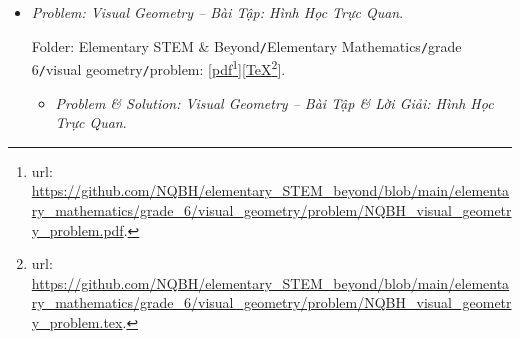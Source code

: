 \documentclass[12pt]{article}
\begin{document}
\begin{itemize}
	Folder: {\sf Elementary STEM \& Beyond{\tt/}Elementary Mathematics{\tt/}grade 6{\tt/}integer{\tt/}problem}: [\href{https://github.com/NQBH/elementary_STEM_beyond/blob/main/elementary_mathematics/grade_6/integer/problem/NQBH_integer_problem.pdf}{pdf}\footnote{{\sc url}: \url{https://github.com/NQBH/elementary_STEM_beyond/blob/main/elementary_mathematics/grade_6/integer/problem/NQBH_integer_problem.pdf}.}][\href{https://github.com/NQBH/elementary_STEM_beyond/blob/main/elementary_mathematics/grade_6/integer/problem/NQBH_integer_problem.tex}{\TeX}\footnote{{\sc url}: \url{https://github.com/NQBH/elementary_STEM_beyond/blob/main/elementary_mathematics/grade_6/integer/problem/NQBH_integer_problem.tex}.}].
	\begin{itemize}
		\item {\it Problem \& Solution: Integers $\mathbb{Z}$ -- Bài Tập \& Lời Giải: Số Nguyên $\mathbb{Z}$}.
		
		Folder: {\sf Elementary STEM \& Beyond{\tt/}Elementary Mathematics{\tt/}grade 6{\tt/}integer{\tt/}solution}: [\href{https://github.com/NQBH/elementary_STEM_beyond/blob/main/elementary_mathematics/grade_6/integer/problem/NQBH_integer_solution.pdf}{pdf}\footnote{{\sc url}: \url{https://github.com/NQBH/elementary_STEM_beyond/blob/main/elementary_mathematics/grade_6/integer/problem/NQBH_integer_solution.pdf}.}][\href{https://github.com/NQBH/elementary_STEM_beyond/blob/main/elementary_mathematics/grade_6/integer/problem/NQBH_integer_solution.tex}{\TeX}\footnote{{\sc url}: \url{https://github.com/NQBH/elementary_STEM_beyond/blob/main/elementary_mathematics/grade_6/integer/problem/NQBH_integer_solution.tex}.}].
	\end{itemize}
	\item {\it Problem: Visual Geometry -- Bài Tập: Hình Học Trực Quan}.
	
	Folder: {\sf Elementary STEM \& Beyond{\tt/}Elementary Mathematics{\tt/}grade 6{\tt/}visual geometry{\tt/}problem}: [\href{https://github.com/NQBH/elementary_STEM_beyond/blob/main/elementary_mathematics/grade_6/visual_geometry/problem/NQBH_visual_geometry_problem.pdf}{pdf}\footnote{{\sc url}: \url{https://github.com/NQBH/elementary_STEM_beyond/blob/main/elementary_mathematics/grade_6/visual_geometry/problem/NQBH_visual_geometry_problem.pdf}.}][\href{https://github.com/NQBH/elementary_STEM_beyond/blob/main/elementary_mathematics/grade_6/visual_geometry/problem/NQBH_visual_geometry_problem.tex}{\TeX}\footnote{{\sc url}: \url{https://github.com/NQBH/elementary_STEM_beyond/blob/main/elementary_mathematics/grade_6/visual_geometry/problem/NQBH_visual_geometry_problem.tex}.}].
	\begin{itemize}
		\item {\it Problem \& Solution: Visual Geometry -- Bài Tập \& Lời Giải: Hình Học Trực Quan}.
		

\end{itemize}
\end{itemize}
\end{document}
